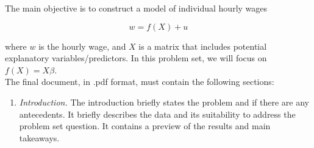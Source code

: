 \documentclass[12pt,a4paper,onecolumn]{article}
\begin{document}
The main objective is to construct a model of individual hourly wages

\begin{equation}
    w = f(X)+u
\end{equation}

where $w$ is the hourly wage, and $X$ is a matrix that includes potential explanatory variables/predictors. In this problem set, we will focus on $f(X) = X\beta$.\\
The final document, in .pdf format, must contain the following sections:

\begin{enumerate}
    \item \textit{Introduction.} The introduction briefly states the problem and if there are any antecedents. It briefly describes the data and its suitability to address the problem set question. It contains a preview of the results and main takeaways.


\end{enumerate}
\end{document}
